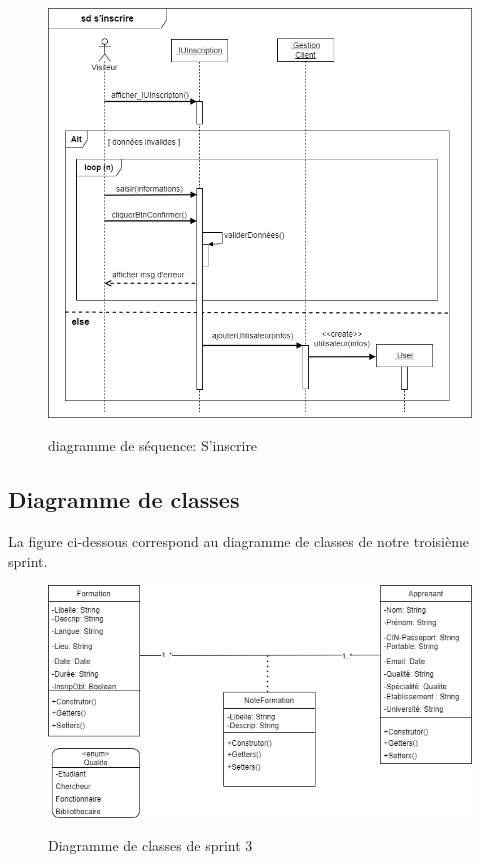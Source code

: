 \begin{itemize}
\begin{figure}[!h]
	\centering
	{\includegraphics[width=1\textwidth]{D) IMAGES/diaginsc.png}}
	\caption{diagramme de séquence: S'inscrire}
	\label{Diagramme3}
\end{figure}
\end{itemize}
\newpage
\subsection{Diagramme de classes}
La figure ci-dessous correspond au diagramme de classes de notre troisième sprint.

 \begin{figure}[!h]
 	\centering
 	{\includegraphics[width=1\textwidth]{D) IMAGES/diagClasse.png}}
 	\caption{Diagramme de classes de sprint 3}
 	\label{Diagramme3}
 \end{figure}
\newpage
